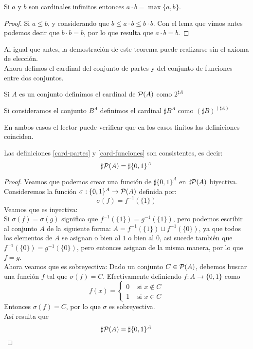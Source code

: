 \documentclass[12pt,a4paper]{book}
\begin{document}
\begin{teo}
Si $a$ y $b$ son cardinales infinitos entonces $a \cdot b = \max \{a,b\}$.
\begin{proof}
Si $a \leq b$, y considerando que $b \leq a \cdot b \leq b \cdot b$. Con el lema que vimos antes podemos decir que $b \cdot b = b$, por lo que resulta que $ a \cdot b = b$.
\end{proof}
\end{teo}
Al igual que antes, la demostración de este teorema puede realizarse sin el axioma de elección.\\[0.5cm]
Ahora defimos el cardinal del conjunto de partes y del conjunto de funciones entre dos conjuntos.
\begin{defi}\label{card-partes}
Si $A$ es un conjunto definimos el cardinal de $\P(A)$ como $2^{\sharp A}$
\end{defi}
\begin{defi}\label{card-funciones}
Si consideramos el conjunto $B^A$ definimos el cardinal $\sharp B^A$ como $(\sharp B)^{(\sharp A)}$
\end{defi}
En ambos casos el lector puede verificar que en los casos finitos las definiciones coinciden.
\begin{prop}
Las definiciones \ref{card-partes} y \ref{card-funciones} son consistentes, es decir:
$$ \sharp \P(A) = \sharp \{0,1\}^A$$
\begin{proof}
Veamos que podemos crear una función de $ \sharp \{0,1\}^A $ en $ \sharp \P(A)$ biyectiva.\\
Consideremos la función $\sigma : \{0,1\}^A \rightarrow \P(A)$ definida por:
$$ \sigma (f) = f^{-1}(\{1\})$$
Veamos que es inyectiva:\\
Si $\sigma(f)= \sigma(g)$ significa que $f^{-1}(\{1\}) = g^{-1}(\{1\})$, pero podemos escribir al conjunto $A$ de la siguiente forma: $A = \displaystyle f^{-1}(\{1\}) \sqcup f^{-1}(\{0\})$, ya que todos los elementos de $A$ se asignan o bien al $1$ o bien al $0$, asi sucede también que $f^{-1}(\{0\}) = g^{-1}(\{0\})$, pero entonces asignan de la misma manera, por lo que $f = g$.\\
Ahora veamos que es sobreyectiva: Dado un conjunto $C \in \P(A)$, debemos buscar una función $f$ tal que $\sigma(f)=C$. Efectivamente definiendo $f: A \rightarrow \{0,1\}$ como 
$$f(x) = \begin{cases} 
0 &\mbox{ si } x \notin C \\ 1 &\mbox{ si } x\in C \end{cases}$$
Entonces $\sigma(f) = C$, por lo que $\sigma$ es sobreyectiva.\\
Así resulta que $$ \sharp \P(A) = \sharp \{0,1\}^A$$
\end{proof}
\end{prop}
\end{document}
